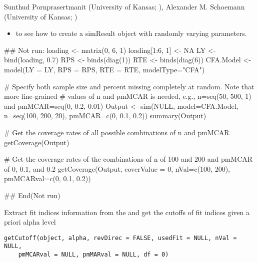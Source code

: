 \documentclass[a4paper]{book}
\begin{document}
%
\begin{Author}\relax
Sunthud Pornprasertmanit (University of Kansas; ), Alexander M. Schoemann (University of Kansas; )
\end{Author}
%
\begin{SeeAlso}\relax
\begin{itemize}

\item {} to see how to create a simResult object with randomly varying parameters.

\end{itemize}

\end{SeeAlso}
%
\begin{Examples}
\begin{ExampleCode}
## Not run: 
loading <- matrix(0, 6, 1)
loading[1:6, 1] <- NA
LY <- bind(loading, 0.7)
RPS <- binds(diag(1))
RTE <- binds(diag(6))
CFA.Model <- model(LY = LY, RPS = RPS, RTE = RTE, modelType="CFA")

# Specify both sample size and percent missing completely at random. Note that more fine-grained 
# values of n and pmMCAR is needed, e.g., n=seq(50, 500, 1) and pmMCAR=seq(0, 0.2, 0.01)
Output <- sim(NULL, model=CFA.Model, n=seq(100, 200, 20), pmMCAR=c(0, 0.1, 0.2))
summary(Output)

# Get the coverage rates of all possible combinations of n and pmMCAR
getCoverage(Output)

# Get the coverage rates of the combinations of n of 100 and 200 and pmMCAR of 0, 0.1, and 0.2
getCoverage(Output, coverValue = 0, nVal=c(100, 200), pmMCARval=c(0, 0.1, 0.2))

## End(Not run)
\end{ExampleCode}
\end{Examples}
%
\begin{Description}\relax
Extract fit indices information from the  and get the cutoffs of fit indices given a priori alpha level
\end{Description}
%
\begin{Usage}
\begin{verbatim}
getCutoff(object, alpha, revDirec = FALSE, usedFit = NULL, nVal = NULL, 
	pmMCARval = NULL, pmMARval = NULL, df = 0)
\end{verbatim}
\end{Usage}
\end{document}
